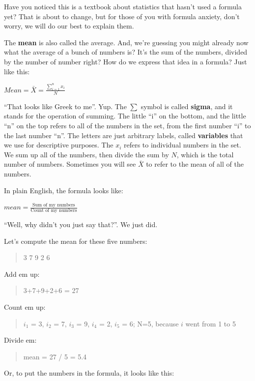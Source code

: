 \documentclass[
]{book}
\begin{document}
Have you noticed this is a textbook about statistics that hasn't used a formula yet? That is about to change, but for those of you with formula anxiety, don't worry, we will do our best to explain them.

The \textbf{mean} is also called the average. And, we're guessing you might already now what the average of a bunch of numbers is? It's the sum of the numbers, divided by the number of number right? How do we express that idea in a formula? Just like this:

\(Mean = \bar{X} = \frac{\sum_{i=1}^{n} x_{i}}{N}\)

``That looks like Greek to me''. Yup. The \(\sum\) symbol is called \textbf{sigma}, and it stands for the operation of summing. The little ``i'' on the bottom, and the little ``n'' on the top refers to all of the numbers in the set, from the first number ``i'' to the last number ``n''. The letters are just arbitrary labels, called \textbf{variables} that we use for descriptive purposes. The \(x_{i}\) refers to individual numbers in the set. We sum up all of the numbers, then divide the sum by \(N\), which is the total number of numbers. Sometimes you will see \(\bar{X}\) to refer to the mean of all of the numbers.

In plain English, the formula looks like:

\(mean = \frac{\text{Sum of my numbers}}{\text{Count of my numbers}}\)

``Well, why didn't you just say that?''. We just did.

Let's compute the mean for these five numbers:

\begin{quote}
3 7 9 2 6
\end{quote}

Add em up:

\begin{quote}
3+7+9+2+6 = 27
\end{quote}

Count em up:

\begin{quote}
\(i_{1}\) = 3, \(i_{2}\) = 7, \(i_{3}\) = 9, \(i_{4}\) = 2, \(i_{5}\) = 6; N=5, because \(i\) went from 1 to 5
\end{quote}

Divide em:

\begin{quote}
mean = 27 / 5 = 5.4
\end{quote}

Or, to put the numbers in the formula, it looks like this:
\end{document}

